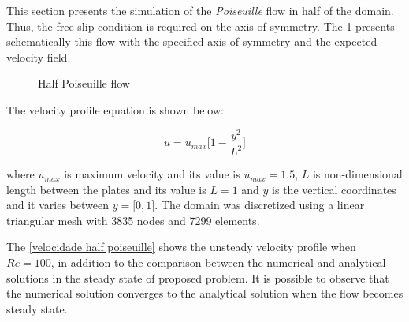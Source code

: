 This section presents the simulation of the \textit{Poiseuille} flow 
in half of the domain. Thus, the free-slip condition is required on 
the axis of symmetry. The \ref{half poiseuille} presents schematically 
this flow with the specified axis of symmetry and the expected velocity 
field.

\begin{figure}[H]
\begin{center}
\end{center}
\caption{Half Poiseuille flow}
\label{half poiseuille}
\end{figure}

\noindent
The velocity profile equation is shown below:

\begin{equation}
 u = u_{max} \big[ 1 - \frac{y^{2}}{L^{2}} \big]
\end{equation}


\medskip
where $u_{max}$ is maximum velocity and its value is 
$u_{max} = 1.5$, $L$ is non-dimensional length 
between the plates and its value is 
$L = 1$
and $y$ is the vertical coordinates and it varies 
between $y = \big[ 0,1 \big]$.
The domain was discretized using a linear triangular mesh
with 3835 nodes and 7299 elements.


\medskip
The \ref{velocidade half poiseuille} shows the unsteady velocity profile
when $Re=100$, in addition to the comparison between the 
numerical and analytical solutions in the steady state of
proposed problem. It is possible to observe that the numerical
solution converges to the analytical solution when the flow
becomes steady state.



